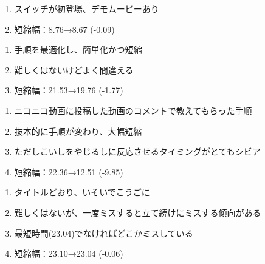 \clearpage
\begin{enumerate}[label={\sarrow}]
\item スイッチが初登場、デモムービーあり
\item 短縮幅：8.76→8.67 (-0.09)
\end{enumerate}



\begin{enumerate}[label={\sarrow}]
\item 手順を最適化し、簡単化かつ短縮
\item 難しくはないけどよく間違える
\item 短縮幅：21.53→19.76 (-1.77)
\end{enumerate}



\begin{enumerate}[label={\sarrow}]
\item ニコニコ動画に投稿した動画のコメントで教えてもらった手順
\item 抜本的に手順が変わり、大幅短縮
\item ただしこいしをやじるしに反応させるタイミングがとてもシビア
\item 短縮幅：22.36→12.51 (-9.85)
\end{enumerate}



\begin{enumerate}[label={\sarrow}]
\item タイトルどおり、いそいでこうごに
\item 難しくはないが、一度ミスすると立て続けにミスする傾向がある
\item 最短時間(23.04)でなければどこかミスしている
\item 短縮幅：23.10→23.04 (-0.06)
\end{enumerate}



